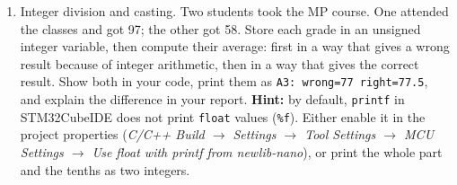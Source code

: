 \documentclass[11pt,a4paper]{article}
\begin{document}
\begin{enumerate}[label=A.\arabic*, leftmargin=2.2em]
        negative.
  \item Integer division and casting. Two students took the MP course. One attended the classes and got 97; the other
        got 58. Store each grade in an unsigned integer variable, then compute their average: first in a way that
        gives a wrong result because of integer arithmetic, then in a way that gives the correct result. Show both in
        your code, print them as \texttt{A3: wrong=77 right=77.5}, and explain the difference in your report.
        \textbf{Hint:} by default, \texttt{printf} in STM32CubeIDE does not print \texttt{float} values
        (\texttt{\%f}). Either enable it in the project properties (\emph{C/C++ Build $\to$ Settings $\to$ Tool Settings $\to$ MCU Settings $\to$
        Use float with printf from newlib-nano}), or print the whole part and the tenths as two integers.
\end{enumerate}
\end{document}
